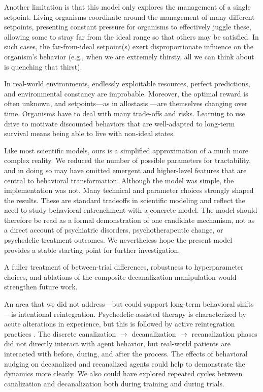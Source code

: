 \documentclass[12pt,fleqn]{article}
\begin{document}
Another limitation is that this model only explores the management of a single setpoint. Living organisms coordinate around the management of many different setpoints, presenting constant pressure for organisms to effectively juggle these, allowing some to stray far from the ideal range so that others may be satisfied. In such cases, the far-from-ideal setpoint(s) exert disproportionate influence on the organism's behavior (e.g., when we are extremely thirsty, all we can think about is quenching that thirst).

In real-world environments, endlessly exploitable resources, perfect predictions, and environmental constancy are improbable. Moreover, the optimal reward is often unknown, and setpoints---as in allostasis \cite{sterling_allostasis_1988}---are themselves changing over time. Organisms have to deal with many trade-offs and risks. Learning to use drive to motivate discounted behaviors that are well-adapted to long-term survival means being able to live with non-ideal states.

Like most scientific models, ours is a simplified approximation of a much more complex reality. We reduced the number of possible parameters for tractability, and in doing so may have omitted emergent and higher-level features that are central to behavioral transformation. Although the model was simple, the implementation was not. Many technical and parameter choices strongly shaped the results. These are standard tradeoffs in scientific modeling and reflect the need to study behavioral entrenchment with a concrete model. The model should therefore be read as a formal demonstration of one candidate mechanism, not as a direct account of psychiatric disorders, psychotherapeutic change, or psychedelic treatment outcomes. We nevertheless hope the present model provides a stable starting point for further investigation.

A fuller treatment of between-trial differences, robustness to hyperparameter choices, and ablations of the composite decanalization manipulation would strengthen future work.

An area that we did not address---but could support long-term behavioral shifts---is intentional reintegration. Psychedelic-assisted therapy is characterized by acute alterations in experience, but this is followed by active reintegration practices \cite{bathje_psychedelic_2022}. The discrete canalization \(\rightarrow\) decanalization \(\rightarrow\) recanalization phases did not directly interact with agent behavior, but real-world patients are interacted with before, during, and after the process. The effects of behavioral nudging on decanalized and recanalized agents could help to demonstrate the dynamics more clearly. We also could have explored repeated cycles between canalization and decanalization both during training and during trials.
\end{document}
